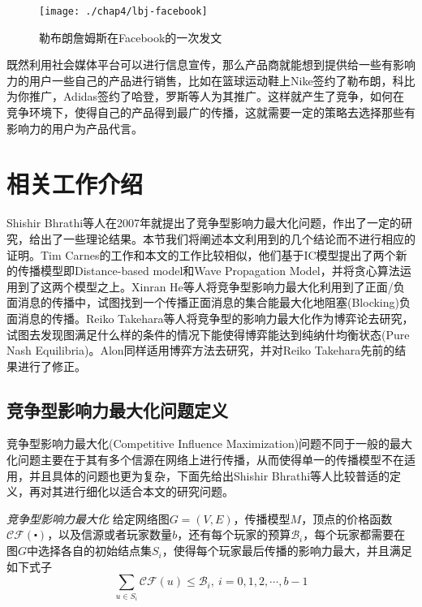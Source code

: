\begin{figure}[H]
	\centering
	\texttt{[image: ./chap4/lbj-facebook]}
	\caption{勒布朗詹姆斯在Facebook的一次发文}
	\label{fig:chap4-lbj-facebook}
\end{figure}

既然利用社会媒体平台可以进行信息宣传，那么产品商就能想到提供给一些有影响力的用户一些自己的产品进行销售，比如在篮球运动鞋上Nike签约了勒布朗，科比为你推广，Adidas签约了哈登，罗斯等人为其推广。这样就产生了竞争，如何在竞争环境下，使得自己的产品得到最广的传播，这就需要一定的策略去选择那些有影响力的用户为产品代言。

\section{相关工作介绍}
Shishir Bhrathi\cite{bharathi2007competitive}等人在2007年就提出了竞争型影响力最大化问题，作出了一定的研究，给出了一些理论结果。本节我们将阐述本文利用到的几个结论而不进行相应的证明。Tim Carnes\cite{carnes2007maximizing}的工作和本文的工作比较相似，他们基于IC模型提出了两个新的传播模型即Distance-based model和Wave Propagation Model，并将贪心算法运用到了这两个模型之上。Xinran He\cite{he2012influence}等人将竞争型影响力最大化利用到了正面/负面消息的传播中，试图找到一个传播正面消息的集合能最大化地阻塞(Blocking)负面消息的传播。Reiko Takehara\cite{takehara2012comment}等人将竞争型的影响力最大化作为博弈论去研究，试图去发现图满足什么样的条件的情况下能使得博弈能达到纯纳什均衡状态(Pure Nash Equilibria)。Alon\cite{alon2010note}同样适用博弈方法去研究，并对Reiko Takehara先前的结果进行了修正。


\subsection{竞争型影响力最大化问题定义}
\label{sec:chap4:def-for-problem}
竞争型影响力最大化(Competitive Influence Maximization)问题不同于一般的最大化问题主要在于其有多个信源在网络上进行传播，从而使得单一的传播模型不在适用，并且具体的问题也更为复杂，下面先给出Shishir Bhrathi\cite{bharathi2007competitive}等人比较普适的定义，再对其进行细化以适合本文的研究问题。

\begin{definition}
\label{def:chap4-bhrathi-kempe-cim}
\emph{竞争型影响力最大化}
给定网络图$G=(V,E)$，传播模型$M$，顶点的价格函数$\mathcal{CF}(\centerdot)$，以及信源或者玩家数量$b$，还有每个玩家的预算$\mathcal{B}_{i}$，每个玩家都需要在图$G$中选择各自的初始结点集$S_{i}$，使得每个玩家最后传播的影响力最大，并且满足如下式子
\begin{displaymath}
\sum_{u \in S_{i}}\mathcal{CF}(u) \leq \mathcal{B}_{i}, ~i=0,1,2,\cdots,b-1
\end{displaymath}
\end{definition}



